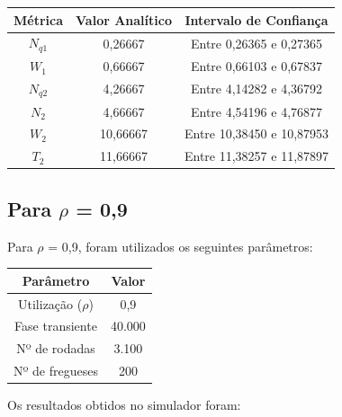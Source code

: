 \documentclass[a4paper,12pt]{report}
\begin{document}
\vspace{-5mm}
\begin{center}
\begin{tabular}{ c c c }
  \hline
  \textbf{Métrica} & \textbf{Valor Analítico} & \textbf{Intervalo de Confiança} \\
  \hline
  $N_{q1}$ & 0,26667 & Entre 0,26365 e 0,27365 \\
  $W_1$    & 0,66667 & Entre 0,66103 e 0,67837 \\
  $N_{q2}$ & 4,26667 & Entre 4,14282 e 4,36792 \\
  $N_2$    & 4,66667 & Entre 4,54196 e 4,76877 \\
  $W_2$    & 10,66667 & Entre 10,38450 e 10,87953 \\
  $T_2$    & 11,66667 & Entre 11,38257 e 11,87897 \\
  \hline
\end{tabular}
\end{center}



\subsection{Para $\rho$ = 0,9}
Para $\rho$ = 0,9, foram utilizados os seguintes parâmetros:

\vspace{-5mm}
\begin{center}
\begin{tabular}{ c c }
  \hline
  \textbf{Parâmetro} & \textbf{Valor}\\
  \hline
  Utilização ($\rho$) & 0,9\\
  Fase transiente & 40.000\\
  Nº de rodadas & 3.100\\
  Nº de fregueses & 200\\
  \hline
\end{tabular}
\end{center}

Os resultados obtidos no simulador foram:
\end{document}

